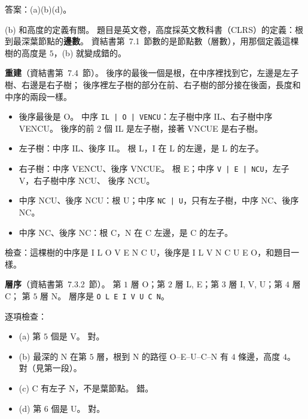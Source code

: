 \begin{pastsoln}
答案：(a)(b)(d)。

(b) 和高度的定義有關。 題目是英文卷，高度採英文教科書（CLRS）的定義：根到最深葉節點的\textbf{邊數}。
資結書第~7.1~節數的是節點數（層數），用那個定義這棵樹的高度是 $5$，(b) 就變成錯的。

\textbf{重建}（資結書第~7.4~節）。 後序的最後一個是根，在中序裡找到它，左邊是左子樹、右邊是右子樹；
後序裡左子樹的部分在前、右子樹的部分接在後面，長度和中序的兩段一樣。
\begin{itemize}
\item 後序最後是 O。 中序 \texttt{IL\,|\,O\,|\,VENCU}：左子樹中序 IL、右子樹中序 VENCU。 後序的前
$2$ 個 IL 是左子樹，接著 VNCUE 是右子樹。
\item 左子樹：中序 IL、後序 IL。 根 L，I 在 L 的左邊，是 L 的左子。
\item 右子樹：中序 VENCU、後序 VNCUE。 根 E；中序 \texttt{V\,|\,E\,|\,NCU}，左子 V，右子樹中序 NCU、
後序 NCU。
\item 中序 NCU、後序 NCU：根 U；中序 \texttt{NC\,|\,U}，只有左子樹，中序 NC、後序 NC。
\item 中序 NC、後序 NC：根 C，N 在 C 左邊，是 C 的左子。
\end{itemize}
\begin{center}
\end{center}
檢查：這棵樹的中序是 I L O V E N C U，後序是 I L V N C U E O，和題目一樣。

\textbf{層序}（資結書第~7.3.2~節）。 第 $1$ 層 O；第 $2$ 層 L, E；第 $3$ 層 I, V, U；第 $4$ 層 C；
第 $5$ 層 N。 層序是 \texttt{O L E I V U C N}。

逐項檢查：
\begin{itemize}
\item (a) 第 $5$ 個是 V。 對。
\item (b) 最深的 N 在第 $5$ 層，根到 N 的路徑 O--E--U--C--N 有 $4$ 條邊，高度 $4$。 對（見第一段）。
\item (c) C 有左子 N，不是葉節點。 錯。
\item (d) 第 $6$ 個是 U。 對。
\end{itemize}
\end{pastsoln}
